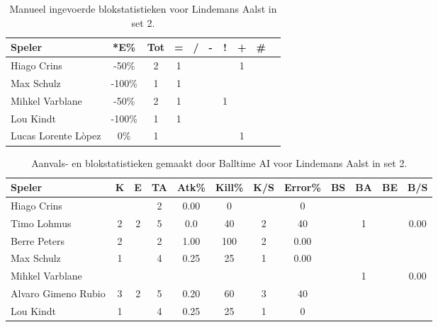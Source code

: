 \begin{table}[ht!]
    \centering
    \scriptsize
    \begin{tabular}{|l|c|c|c|c|c|c|c|c|c|}
        \hline
        \textbf{Speler} & *E\% & Tot & = & / & - & ! & + & \# \\ \hline
        Hiago Crins & -50\% & 2 & 1 &  &  &  & 1 &  \\
        Max Schulz & -100\% & 1 & 1 &  &  &  &  & \\
        Mihkel Varblane & -50\% & 2 & 1 &  &  & 1 &  & \\
        Lou Kindt & -100\% & 1 & 1 &  &  &  &  & \\
        Lucas Lorente Lòpez & 0\% & 1 &  &  &  &  & 1 & \\ \hline
    \end{tabular}
    \caption[Manueel ingevoerde blokstatistieken voor Lindemans Aalst in set 2]{\label{tab:PL3BlockAalstMan2}Manueel ingevoerde blokstatistieken voor Lindemans Aalst in set 2.}
\end{table}

\begin{table}[ht!]
  \centering
  \scriptsize
  \begin{tabular}{|l|c|c|c|c|c|c|c|c|c|c|c|} \hline
    \textbf{Speler} &  K & E & TA & Atk\% & Kill\% & K/S & Error\% & BS & BA & BE & B/S\\ \hline
    Hiago Crins &  &  & 2 & 0.00 & 0 &  & 0 &  &  &&\\
    Timo Lohmus & 2 & 2 & 5 & 0.0 & 40 & 2 & 40 &  & 1 & & 0.00 \\
    Berre Peters & 2 &  & 2 & 1.00 & 100 & 2 & 0.00 &   &  & & \\
    Max Schulz & 1 &  & 4 & 0.25 & 25 & 1 & 0.00 &   &  && \\
    Mihkel Varblane &   &   &   &   &   &   &   &  & 1 & & 0.00\\
    Alvaro Gimeno Rubio & 3 & 2 & 5 & 0.20 & 60 & 3 & 40 &   &  && \\
    Lou Kindt & 1 &  & 4 & 0.25 & 25 & 1 & 0 &   &  && \\ \hline
  \end{tabular}
  \caption[Aanvals- en blokstatistieken gemaakt door Balltime AI voor Lindemans Aalst in set 2]{\label{tab:PL3AttBlockAalstAI2}Aanvals- en blokstatistieken gemaakt door Balltime AI voor Lindemans Aalst in set 2.}
\end{table}
